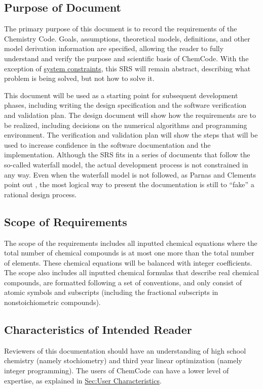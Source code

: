 \documentclass[12pt]{article}
\begin{document}
\subsection{Purpose of Document}
\label{Sec:DocPurpose}
The primary purpose of this document is to record the requirements of the Chemistry Code. Goals, assumptions, theoretical models, definitions, and other model derivation information are specified, allowing the reader to fully understand and verify the purpose and scientific basis of ChemCode. With the exception of \hyperref[Sec:SysConstraints]{system constraints}, this SRS will remain abstract, describing what problem is being solved, but not how to solve it.

This document will be used as a starting point for subsequent development phases, including writing the design specification and the software verification and validation plan. The design document will show how the requirements are to be realized, including decisions on the numerical algorithms and programming environment. The verification and validation plan will show the steps that will be used to increase confidence in the software documentation and the implementation. Although the SRS fits in a series of documents that follow the so-called waterfall model, the actual development process is not constrained in any way. Even when the waterfall model is not followed, as Parnas and Clements point out \cite{parnasClements1986}, the most logical way to present the documentation is still to ``fake'' a rational design process.

\subsection{Scope of Requirements}
\label{Sec:ReqsScope}
The scope of the requirements includes all inputted chemical equations where the total number of chemical compounds is at most one more than the total number of elements. These chemical equations will be balanced with integer coefficients. The scope also includes all inputted chemical formulas that describe real chemical compounds, are formatted following a set of conventions, and only consist of atomic symbols and subscripts (including the fractional subscripts in nonstoichiometric compounds).

\subsection{Characteristics of Intended Reader}
\label{Sec:ReaderChars}
Reviewers of this documentation should have an understanding of high school chemistry (namely stochiometry) and third year linear optimization (namely integer programming). The users of ChemCode can have a lower level of expertise, as explained in \hyperref[Sec:UserChars]{Sec:User Characteristics}.
\end{document}
